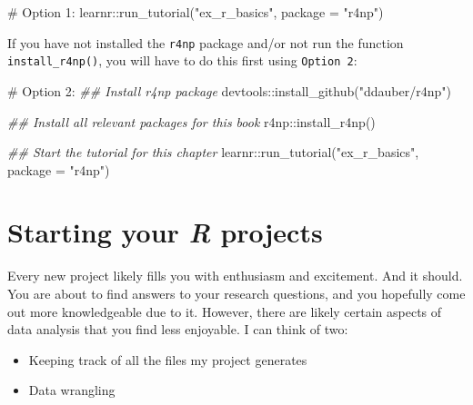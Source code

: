 \documentclass[
  letterpaper,
]{krantz}
\makeatletter
\newenvironment{Shaded}{\begin{snugshade}}{\end{snugshade}}
\newcommand{\AttributeTok}[1]{\textcolor[rgb]{0.40,0.45,0.13}{#1}}
\newcommand{\CommentTok}[1]{\textcolor[rgb]{0.37,0.37,0.37}{#1}}
\newcommand{\DocumentationTok}[1]{\textcolor[rgb]{0.37,0.37,0.37}{\textit{#1}}}
\newcommand{\FunctionTok}[1]{\textcolor[rgb]{0.28,0.35,0.67}{#1}}
\newcommand{\NormalTok}[1]{\textcolor[rgb]{0.00,0.23,0.31}{#1}}
\newcommand{\SpecialCharTok}[1]{\textcolor[rgb]{0.37,0.37,0.37}{#1}}
\newcommand{\StringTok}[1]{\textcolor[rgb]{0.13,0.47,0.30}{#1}}
\newenvironment{kframe}{%
\medskip{}
\setlength{\fboxsep}{.8em}
 \def\at@end@of@kframe{}%
 \ifinner\ifhmode%
  \def\at@end@of@kframe{\end{minipage}}%
  \begin{minipage}{\columnwidth}%
 \fi\fi%
 \def\FrameCommand##1{\hskip\@totalleftmargin \hskip-\fboxsep
 \colorbox{shadecolor}{##1}\hskip-\fboxsep
     \hskip-\linewidth \hskip-\@totalleftmargin \hskip\columnwidth}%
 \MakeFramed {\advance\hsize-\width
   \@totalleftmargin\z@ \linewidth\hsize
   \@setminipage}}%
 {\par\unskip\endMakeFramed%
 \at@end@of@kframe}
\renewenvironment{Shaded}{\begin{kframe}}{\end{kframe}}
\makeatother
\begin{document}
\begin{Shaded}
\begin{Highlighting}[]
\CommentTok{\# Option 1:}
\NormalTok{learnr}\SpecialCharTok{::}\FunctionTok{run\_tutorial}\NormalTok{(}\StringTok{"ex\_r\_basics"}\NormalTok{, }\AttributeTok{package =} \StringTok{"r4np"}\NormalTok{)}
\end{Highlighting}
\end{Shaded}

If you have not installed the \texttt{r4np} package and/or not run the
function \texttt{install\_r4np()}, you will have to do this first using
\texttt{Option\ 2}:

\begin{Shaded}
\begin{Highlighting}[]
\CommentTok{\# Option 2:}
\DocumentationTok{\#\# Install \textquotesingle{}r4np\textquotesingle{} package}
\NormalTok{devtools}\SpecialCharTok{::}\FunctionTok{install\_github}\NormalTok{(}\StringTok{"ddauber/r4np"}\NormalTok{)}

\DocumentationTok{\#\# Install all relevant packages for this book}
\NormalTok{r4np}\SpecialCharTok{::}\FunctionTok{install\_r4np}\NormalTok{()}

\DocumentationTok{\#\# Start the tutorial for this chapter}
\NormalTok{learnr}\SpecialCharTok{::}\FunctionTok{run\_tutorial}\NormalTok{(}\StringTok{"ex\_r\_basics"}\NormalTok{, }\AttributeTok{package =} \StringTok{"r4np"}\NormalTok{)}
\end{Highlighting}
\end{Shaded}


\chapter{\texorpdfstring{Starting your \emph{R}
projects}{Starting your R projects}}\label{starting-your-r-projects}

Every new project likely fills you with enthusiasm and excitement. And
it should. You are about to find answers to your research questions, and
you hopefully come out more knowledgeable due to it. However, there are
likely certain aspects of data analysis that you find less enjoyable. I
can think of two:

\begin{itemize}
\item
  Keeping track of all the files my project generates
\item
  Data wrangling
\end{itemize}
\end{document}
